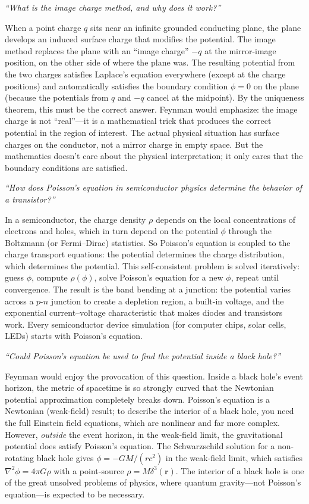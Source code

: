 \documentclass[11pt,openright]{book}
\begin{document}
\textit{``What is the image charge method, and why does it work?''}

When a point charge $q$ sits near an infinite grounded conducting plane, the plane develops an induced surface charge that modifies the potential. The image method replaces the plane with an ``image charge'' $-q$ at the mirror-image position, on the other side of where the plane was. The resulting potential from the two charges satisfies Laplace's equation everywhere (except at the charge positions) and automatically satisfies the boundary condition $\phi = 0$ on the plane (because the potentials from $q$ and $-q$ cancel at the midpoint). By the uniqueness theorem, this must be the correct answer. Feynman would emphasize: the image charge is not ``real''---it is a mathematical trick that produces the correct potential in the region of interest. The actual physical situation has surface charges on the conductor, not a mirror charge in empty space. But the mathematics doesn't care about the physical interpretation; it only cares that the boundary conditions are satisfied.

\textit{``How does Poisson's equation in semiconductor physics determine the behavior of a transistor?''}

In a semiconductor, the charge density $\rho$ depends on the local concentrations of electrons and holes, which in turn depend on the potential $\phi$ through the Boltzmann (or Fermi--Dirac) statistics. So Poisson's equation is coupled to the charge transport equations: the potential determines the charge distribution, which determines the potential. This self-consistent problem is solved iteratively: guess $\phi$, compute $\rho(\phi)$, solve Poisson's equation for a new $\phi$, repeat until convergence. The result is the band bending at a junction: the potential varies across a $p$-$n$ junction to create a depletion region, a built-in voltage, and the exponential current--voltage characteristic that makes diodes and transistors work. Every semiconductor device simulation (for computer chips, solar cells, LEDs) starts with Poisson's equation.

\textit{``Could Poisson's equation be used to find the potential inside a black hole?''}

Feynman would enjoy the provocation of this question. Inside a black hole's event horizon, the metric of spacetime is so strongly curved that the Newtonian potential approximation completely breaks down. Poisson's equation is a Newtonian (weak-field) result; to describe the interior of a black hole, you need the full Einstein field equations, which are nonlinear and far more complex. However, \emph{outside} the event horizon, in the weak-field limit, the gravitational potential does satisfy Poisson's equation. The Schwarzschild solution for a non-rotating black hole gives $\phi = -GM/(rc^2)$ in the weak-field limit, which satisfies $\nabla^2\phi = 4\pi G\rho$ with a point-source $\rho = M\delta^3(\mathbf{r})$. The interior of a black hole is one of the great unsolved problems of physics, where quantum gravity---not Poisson's equation---is expected to be necessary.
\end{document}
